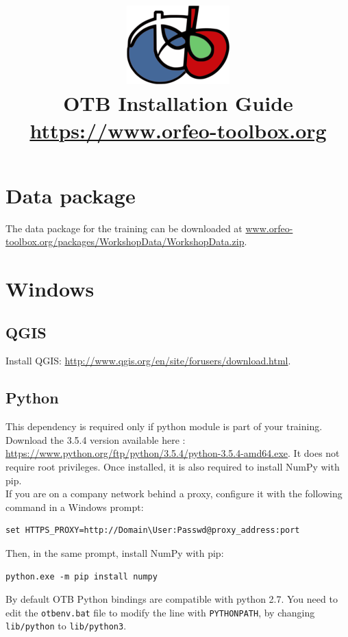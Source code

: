 \documentclass[10pt,a4paper]{article}
\title{\includegraphics[scale=1]{Art/otb-logo.png}\\
  OTB Installation Guide\\
  {\small\url{https://www.orfeo-toolbox.org}}
}
\begin{document}
\maketitle

\tableofcontents

\clearpage
\section{Data package}

The data package for the training can be downloaded at
\url{www.orfeo-toolbox.org/packages/WorkshopData/WorkshopData.zip}.

\section{Windows}

\subsection{QGIS}
Install QGIS: \url{http://www.qgis.org/en/site/forusers/download.html}.

\subsection{Python}

This dependency is required only if python module is part of your
training. Download the 3.5.4 version available here :
\url{https://www.python.org/ftp/python/3.5.4/python-3.5.4-amd64.exe}. It does
not require root privileges. Once installed, it is also required to install
NumPy with pip.\\

If you are on a company network behind a proxy, configure it with the following
command in a Windows prompt:

\begin{verbatim}
set HTTPS_PROXY=http://Domain\User:Passwd@proxy_address:port
\end{verbatim}

Then, in the same prompt, install NumPy with pip:

\begin{verbatim}
python.exe -m pip install numpy
\end{verbatim}

By default OTB Python bindings are compatible with python 2.7. You need to edit
the \verb?otbenv.bat? file to modify the line with \verb?PYTHONPATH?, by
changing \verb?lib/python? to \verb?lib/python3?.
\end{document}
